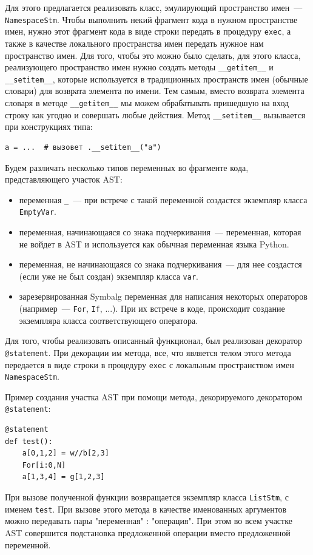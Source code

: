 Для этого предлагается реализовать класс, эмулирующий пространство имен~--- \verb"NamespaceStm".
Чтобы выполнить некий фрагмент кода в нужном пространстве имен, нужно этот фрагмент кода в виде строки передать в процедуру 
\verb"exec", а также в качестве локального пространства имен передать нужное нам пространство имен.
Для того, чтобы это можно было сделать, для этого класса, реализующего пространство имен нужно создать методы \verb"__getitem__" и \verb"__setitem__", которые используется в традиционных пространств имен (обычные словари) для возврата элемента по имени. 
Тем самым, вместо возврата элемента словаря в методе \verb"__getitem__" мы можем обрабатывать пришедшую на вход строку как угодно и совершать любые действия. Метод \verb"__setitem__" вызывается при конструкциях типа:
\begin{verbatim}
a = ...  # вызовет .__setitem__("a")
\end{verbatim}
Будем различать несколько типов переменных во фрагменте кода, представляющего участок AST:
\begin{itemize}
    \item переменная \verb"_"~--- при встрече с такой переменной создастся экземпляр класса \verb"EmptyVar".
    \item переменная, начинающаяся со знака подчеркивания~--- переменная, которая не войдет в AST и используется как обычная переменная языка {\sf Python}.
    \item переменная, не начинающаяся со знака подчеркивания~--- для нее создастся (если уже не был создан) экземпляр класса \verb"var".
    \item зарезервированная {\sf Symbalg} переменная для написания некоторых операторов (например~--- \verb"For", \verb"If", ...). При их встрече в коде, происходит создание экземпляра класса соответствующего оператора.
\end{itemize}

Для того, чтобы реализовать описанный функционал, был реализован декоратор \verb"@statement". При декорации им метода, все, что является телом этого метода передается в виде строки в процедуру \verb"exec" с локальным пространством имен \verb"NamespaceStm". 

Пример создания участка AST при помощи метода, декорируемого декоратором \verb"@statement":
\begin{verbatim}
@statement
def test():
    a[0,1,2] = w//b[2,3]
    For[i:0,N]
    a[1,3,4] = g[1,2,3]
\end{verbatim}

При вызове полученной функции возвращается экземпляр класса \verb"ListStm", с именем \verb"test". При вызове этого метода в качестве именованных аргументов можно передавать пары "переменная" : "операция". При этом во всем участке AST совершится подстановка предложенной операции вместо предложенной переменной.

